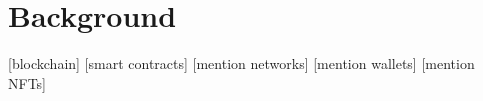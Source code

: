 \section{Background}


[blockchain]
[smart contracts]
[mention networks]
[mention wallets]
[mention NFTs]
